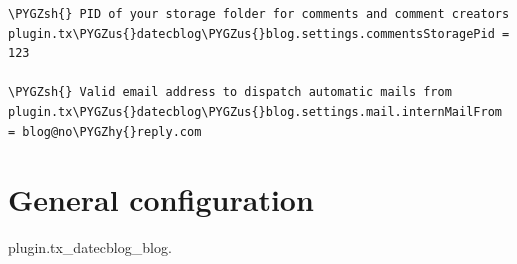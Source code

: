 \documentclass[a4paper,10pt,english]{sphinxmanual}
\def\PYGZus{\char`\_}
\def\PYGZsh{\char`\#}
\def\PYGZhy{\char`\-}
\begin{document}
\begin{Verbatim}[frame=single,commandchars=\\\{\}]
\PYGZsh{} PID of your storage folder for comments and comment creators
plugin.tx\PYGZus{}datecblog\PYGZus{}blog.settings.commentsStoragePid = 123

\PYGZsh{} Valid email address to dispatch automatic mails from
plugin.tx\PYGZus{}datecblog\PYGZus{}blog.settings.mail.internMailFrom = blog@no\PYGZhy{}reply.com
\end{Verbatim}


\section{General configuration}
\label{Configuration/Index:general-configuration}
plugin.tx\_datecblog\_blog.
\end{document}
